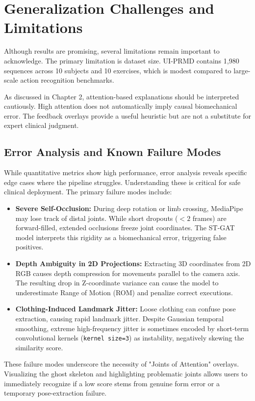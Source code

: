 \section{Generalization Challenges and Limitations}
Although results are promising, several limitations remain important to acknowledge. The primary limitation is dataset size. UI-PRMD contains 1,980 sequences across 10 subjects and 10 exercises, which is modest compared to large-scale action recognition benchmarks.

As discussed in Chapter 2, attention-based explanations should be interpreted cautiously. High attention does not automatically imply causal biomechanical error. The feedback overlays provide a useful heuristic but are not a substitute for expert clinical judgment.

\subsection{Error Analysis and Known Failure Modes}
While quantitative metrics show high performance, error analysis reveals specific edge cases where the pipeline struggles. Understanding these is critical for safe clinical deployment. The primary failure modes include:

\begin{itemize}
    \item \textbf{Severe Self-Occlusion:} During deep rotation or limb crossing, MediaPipe may lose track of distal joints. While short dropouts ($< 2$ frames) are forward-filled, extended occlusions freeze joint coordinates. The ST-GAT model interprets this rigidity as a biomechanical error, triggering false positives.
    \item \textbf{Depth Ambiguity in 2D Projections:} Extracting 3D coordinates from 2D RGB causes depth compression for movements parallel to the camera axis. The resulting drop in Z-coordinate variance can cause the model to underestimate Range of Motion (ROM) and penalize correct executions.
    \item \textbf{Clothing-Induced Landmark Jitter:} Loose clothing can confuse pose extraction, causing rapid landmark jitter. Despite Gaussian temporal smoothing, extreme high-frequency jitter is sometimes encoded by short-term convolutional kernels (\texttt{kernel size=3}) as instability, negatively skewing the similarity score.
\end{itemize}

These failure modes underscore the necessity of "Joints of Attention" overlays. Visualizing the ghost skeleton and highlighting problematic joints allows users to immediately recognize if a low score stems from genuine form error or a temporary pose-extraction failure.